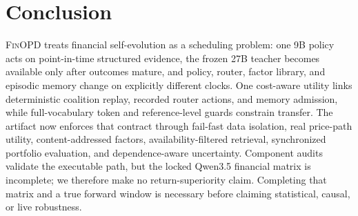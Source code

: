 \section{Conclusion}
\label{sec:conclusion}

\textsc{FinOPD} treats financial self-evolution as a scheduling problem: one 9B policy acts on point-in-time structured evidence, the frozen 27B teacher becomes available only after outcomes mature, and policy, router, factor library, and episodic memory change on explicitly different clocks. One cost-aware utility links deterministic coalition replay, recorded router actions, and memory admission, while full-vocabulary token and reference-level guards constrain transfer. The artifact now enforces that contract through fail-fast data isolation, real price-path utility, content-addressed factors, availability-filtered retrieval, synchronized portfolio evaluation, and dependence-aware uncertainty. Component audits validate the executable path, but the locked Qwen3.5 financial matrix is incomplete; we therefore make no return-superiority claim. Completing that matrix and a true forward window is necessary before claiming statistical, causal, or live robustness.
